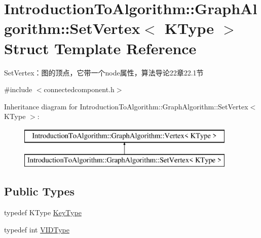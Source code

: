 \hypertarget{struct_introduction_to_algorithm_1_1_graph_algorithm_1_1_set_vertex}{}\section{Introduction\+To\+Algorithm\+:\+:Graph\+Algorithm\+:\+:Set\+Vertex$<$ K\+Type $>$ Struct Template Reference}
\label{struct_introduction_to_algorithm_1_1_graph_algorithm_1_1_set_vertex}


Set\+Vertex：图的顶点，它带一个node属性，算法导论22章22.1节  




{\ttfamily \#include $<$connectedcomponent.\+h$>$}

Inheritance diagram for Introduction\+To\+Algorithm\+:\+:Graph\+Algorithm\+:\+:Set\+Vertex$<$ K\+Type $>$\+:\begin{figure}[H]
\begin{center}
\leavevmode
\includegraphics[height=2.000000cm]{struct_introduction_to_algorithm_1_1_graph_algorithm_1_1_set_vertex}
\end{center}
\end{figure}
\subsection*{Public Types}
\begin{DoxyCompactItemize}
\item 
typedef K\+Type \hyperlink{struct_introduction_to_algorithm_1_1_graph_algorithm_1_1_set_vertex_a0cfdcd9af991198be63495f7fb60965d}{Key\+Type}
\item 
typedef int \hyperlink{struct_introduction_to_algorithm_1_1_graph_algorithm_1_1_set_vertex_ae69791a589d95b0f4f378e08b75b041c}{V\+I\+D\+Type}
\end{DoxyCompactItemize}
